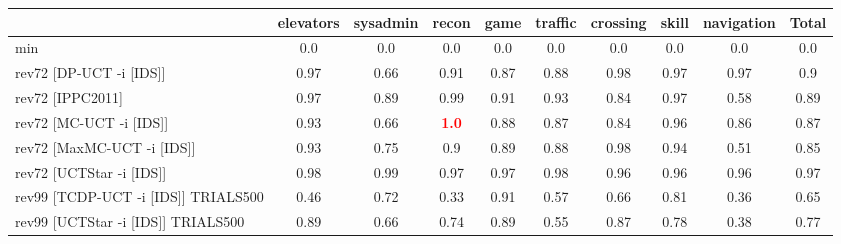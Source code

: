\documentclass{article}
\begin{document}
\begin{tabular}{|l|r@{$\pm$}rr@{$\pm$}rr@{$\pm$}rr@{$\pm$}rr@{$\pm$}rr@{$\pm$}rr@{$\pm$}rr@{$\pm$}rr@{$\pm$}r|}
\hline

& \multicolumn{2}{c}{elevators}
& \multicolumn{2}{c}{sysadmin}
& \multicolumn{2}{c}{recon}
& \multicolumn{2}{c}{game}
& \multicolumn{2}{c}{traffic}
& \multicolumn{2}{c}{crossing}
& \multicolumn{2}{c}{skill}
& \multicolumn{2}{c}{navigation}
& \multicolumn{2}{c|}{Total}
\\
\hline
\hline
min
& \multicolumn{2}{c}{0.0}
& \multicolumn{2}{c}{0.0}
& \multicolumn{2}{c}{0.0}
& \multicolumn{2}{c}{0.0}
& \multicolumn{2}{c}{0.0}
& \multicolumn{2}{c}{0.0}
& \multicolumn{2}{c}{0.0}
& \multicolumn{2}{c}{0.0}
& \multicolumn{2}{c|}{0.0}
\\
rev72 [DP-UCT -i [IDS]]
& \multicolumn{2}{c}{0.97}
& \multicolumn{2}{c}{0.66}
& \multicolumn{2}{c}{0.91}
& \multicolumn{2}{c}{0.87}
& \multicolumn{2}{c}{0.88}
& \multicolumn{2}{c}{0.98}
& \multicolumn{2}{c}{0.97}
& \multicolumn{2}{c}{0.97}
& \multicolumn{2}{c|}{0.9}
\\
rev72 [IPPC2011]
& \multicolumn{2}{c}{0.97}
& \multicolumn{2}{c}{0.89}
& \multicolumn{2}{c}{0.99}
& \multicolumn{2}{c}{0.91}
& \multicolumn{2}{c}{0.93}
& \multicolumn{2}{c}{0.84}
& \multicolumn{2}{c}{0.97}
& \multicolumn{2}{c}{0.58}
& \multicolumn{2}{c|}{0.89}
\\
rev72 [MC-UCT -i [IDS]]
& \multicolumn{2}{c}{0.93}
& \multicolumn{2}{c}{0.66}
& \multicolumn{2}{c}{\textbf{\textcolor{red}{1.0}}}
& \multicolumn{2}{c}{0.88}
& \multicolumn{2}{c}{0.87}
& \multicolumn{2}{c}{0.84}
& \multicolumn{2}{c}{0.96}
& \multicolumn{2}{c}{0.86}
& \multicolumn{2}{c|}{0.87}
\\
rev72 [MaxMC-UCT -i [IDS]]
& \multicolumn{2}{c}{0.93}
& \multicolumn{2}{c}{0.75}
& \multicolumn{2}{c}{0.9}
& \multicolumn{2}{c}{0.89}
& \multicolumn{2}{c}{0.88}
& \multicolumn{2}{c}{0.98}
& \multicolumn{2}{c}{0.94}
& \multicolumn{2}{c}{0.51}
& \multicolumn{2}{c|}{0.85}
\\
rev72 [UCTStar -i [IDS]]
& \multicolumn{2}{c}{0.98}
& \multicolumn{2}{c}{0.99}
& \multicolumn{2}{c}{0.97}
& \multicolumn{2}{c}{0.97}
& \multicolumn{2}{c}{0.98}
& \multicolumn{2}{c}{0.96}
& \multicolumn{2}{c}{0.96}
& \multicolumn{2}{c}{0.96}
& \multicolumn{2}{c|}{0.97}
\\
\hline
rev99 [TCDP-UCT -i [IDS]] TRIALS500
& \multicolumn{2}{c}{0.46}
& \multicolumn{2}{c}{0.72}
& \multicolumn{2}{c}{0.33}
& \multicolumn{2}{c}{0.91}
& \multicolumn{2}{c}{0.57}
& \multicolumn{2}{c}{0.66}
& \multicolumn{2}{c}{0.81}
& \multicolumn{2}{c}{0.36}
& \multicolumn{2}{c|}{0.65}
\\
rev99 [UCTStar -i [IDS]] TRIALS500
& \multicolumn{2}{c}{0.89}
& \multicolumn{2}{c}{0.66}
& \multicolumn{2}{c}{0.74}
& \multicolumn{2}{c}{0.89}
& \multicolumn{2}{c}{0.55}
& \multicolumn{2}{c}{0.87}
& \multicolumn{2}{c}{0.78}
& \multicolumn{2}{c}{0.38}
& \multicolumn{2}{c|}{0.77}
\\
\hline
\end{tabular}%

\bigskip
\end{document}
